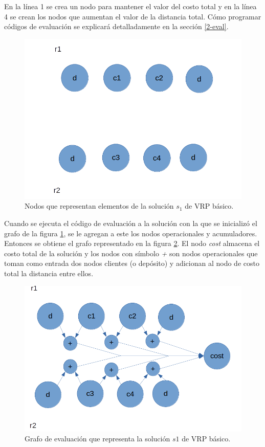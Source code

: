 En la línea 1 se crea un nodo para mantener el valor del costo total y en la línea 4 se crean los nodos que aumentan el valor de la distancia total. Cómo programar códigos de evaluación se explicará detalladamente en la sección \ref{2-eval}.

\begin{figure}
	\centering
	\includegraphics[width=0.9\linewidth]{Graphics/graph-init}
	\caption{Nodos que representan elementos de la solución $s_1$ de VRP básico.}
	\label{fig:eval-graph-1}
\end{figure}

Cuando se ejecuta el código de evaluación a la solución con la que se inicializó el grafo de la figura \ref{fig:eval-graph-1}, se le agregan a este los nodos operacionales y acumuladores. Entonces se obtiene el grafo representado en la figura \ref{fig:eval-graph-2}. El nodo \textit{cost} almacena el costo total de la solución y los nodos con símbolo \textit{+} son nodos operacionales que toman como entrada dos nodos clientes (o depósito) y adicionan al nodo de costo total la distancia entre ellos.

\begin{figure}
	\centering
	\includegraphics[width=0.9\linewidth]{Graphics/eval-graph-2}
	\caption{Grafo de evaluación que representa la solución $s1$ de VRP básico.}
	\label{fig:eval-graph-2}
\end{figure}

